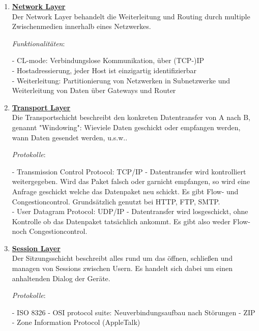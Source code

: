\documentclass[11pt]{article}
\begin{document}
\begin{enumerate}
        \item \textbf{\underline{Network Layer}}\\
        Der Network Layer behandelt die Weiterleitung und Routing durch multiple Zwischenmedien innerhalb
        eines Netzwerkes.

        \emph{Funktionalitäten}:
        \begin{addmargin}[1em]{1em}
            - CL-mode: Verbindungslose Kommunikation, über (TCP-)IP\\
            - Hostadressierung, jeder Host ist einzigartig identifizierbar\\
            - Weiterleitung: Partitionierung von Netzwerken in Subnetzwerke und Weiterleitung
            von Daten über Gateways und Router\\
        \end{addmargin}

        \item \textbf{\underline{Transport Layer}}\\
        Die Transportschicht beschreibt den konkreten Datentransfer von A nach B, genannt "Windowing": Wieviele Daten geschickt oder empfangen werden,
        wann Daten gesendet werden, u.s.w..

        \emph{Protokolle}:
        \begin{addmargin}[1em]{1em}
            - Transmission Control Protocol: TCP/IP - Datentransfer wird kontrolliert weitergegeben. Wird das Paket falsch oder garnicht
            empfangen, so wird eine Anfrage geschickt welche das Datenpaket neu schickt.
            Es gibt Flow- und Congestioncontrol. Grundsätzlich genutzt bei HTTP, FTP, SMTP.\\
            - User Datagram Protocol: UDP/IP - Datentransfer wird losgeschickt, ohne Kontrolle ob das Datenpaket tatsächlich ankommt.
            Es gibt also weder Flow- noch Congestioncontrol.\\
        \end{addmargin}

        \item \textbf{\underline{Session Layer}}\\
        Der Sitzungsschicht beschreibt alles rund um das öffnen, schließen und managen von Sessions zwischen Usern.
        Es handelt sich dabei um einen anhaltenden Dialog der Geräte.

        \emph{Protokolle}:
        \begin{addmargin}[1em]{1em}
            - ISO 8326 - OSI protocol suite: Neuverbindungsaufbau nach Störungen
            - ZIP - Zone Information Protocol (AppleTalk)
        \end{addmargin}


\end{enumerate}
\end{document}

